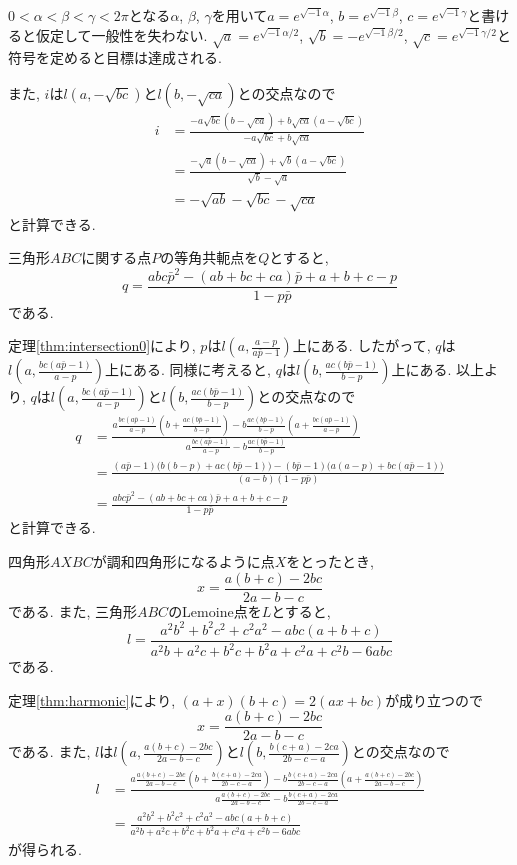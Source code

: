 \begin{prf*}
$0<\alpha<\beta<\gamma<2\pi$となる$\alpha$, $\beta$, $\gamma$を用いて$a=e^{\sqrt{-1}\alpha}$, $b=e^{\sqrt{-1}\beta}$, $c=e^{\sqrt{-1}\gamma}$と書けると仮定して一般性を失わない.
$\sqrt{a}=e^{\sqrt{-1}\alpha/2}$, $\sqrt{b}=-e^{\sqrt{-1}\beta/2}$, $\sqrt{c}=e^{\sqrt{-1}\gamma/2}$と符号を定めると目標は達成される.

また, $i$は$l(a,-\sqrt{bc})$と$l(b,-\sqrt{ca})$との交点なので
\begin{align*}
i
&=\frac{-a\sqrt{bc}(b-\sqrt{ca})+b\sqrt{ca}(a-\sqrt{bc})}{-a\sqrt{bc}+b\sqrt{ca}}\\
&=\frac{-\sqrt{a}(b-\sqrt{ca})+\sqrt{b}(a-\sqrt{bc})}{\sqrt{b}-\sqrt{a}}\\
&=-\sqrt{ab}-\sqrt{bc}-\sqrt{ca}
\end{align*}
と計算できる.
\end{prf*}
%
%
\begin{bthm}\label{thm:isogonal_conjugate}
三角形$ABC$に関する点$P$の等角共軛点を$Q$とすると,
\[q=\frac{abc\bar p^2-(ab+bc+ca)\bar p+a+b+c-p}{1-p\bar p}\]
である.
\end{bthm}
\begin{prf*}
定理\ref{thm:intersection0}により, $p$は$l(a,\frac{a-p}{a\bar p-1})$上にある.
したがって, $q$は$l(a,\frac{bc(a\bar p-1)}{a-p})$上にある.
同様に考えると, $q$は$l(b,\frac{ac(b\bar p-1)}{b-p})$上にある.
以上より, $q$は$l(a,\frac{bc(a\bar p-1)}{a-p})$と$l(b,\frac{ac(b\bar p-1)}{b-p})$との交点なので
\begin{align*}
q
&=\frac{a\frac{bc(a\bar p-1)}{a-p}(b+\frac{ac(b\bar p-1)}{b-p})-b\frac{ac(b\bar p-1)}{b-p}(a+\frac{bc(a\bar p-1)}{a-p})}{a\frac{bc(a\bar p-1)}{a-p}-b\frac{ac(b\bar p-1)}{b-p}}\\
&=\frac{(a\bar p-1)\bigl(b(b-p)+ac(b\bar p-1)\bigr)-(b\bar p-1)\bigl(a(a-p)+bc(a\bar p-1)\bigr)}{(a-b)(1-p\bar p)}\\
&=\frac{abc\bar p^2-(ab+bc+ca)\bar p+a+b+c-p}{1-p\bar p}
\end{align*}
と計算できる.
\end{prf*}
%
%
\begin{bthm}\label{thm:lemoine}
四角形$AXBC$が調和四角形になるように点$X$をとったとき,
\[x=\frac{a(b+c)-2bc}{2a-b-c}\]
である.
また, 三角形$ABC$のLemoine点を$L$とすると,
\[l=\frac{a^2b^2+b^2c^2+c^2a^2-abc(a+b+c)}{a^2b+a^2c+b^2c+b^2a+c^2a+c^2b-6abc}\]
である.
\end{bthm}
\begin{prf*}
定理\ref{thm:harmonic}により, $(a+x)(b+c)=2(ax+bc)$が成り立つので
\[x=\frac{a(b+c)-2bc}{2a-b-c}\]
である.
また, $l$は$l(a,\frac{a(b+c)-2bc}{2a-b-c})$と$l(b,\frac{b(c+a)-2ca}{2b-c-a})$との交点なので
\begin{align*}
l
&=\frac{a\frac{a(b+c)-2bc}{2a-b-c}(b+\frac{b(c+a)-2ca}{2b-c-a})-b\frac{b(c+a)-2ca}{2b-c-a}(a+\frac{a(b+c)-2bc}{2a-b-c})}{a\frac{a(b+c)-2bc}{2a-b-c}-b\frac{b(c+a)-2ca}{2b-c-a}}\\
&=\frac{a^2b^2+b^2c^2+c^2a^2-abc(a+b+c)}{a^2b+a^2c+b^2c+b^2a+c^2a+c^2b-6abc}
\end{align*}
が得られる.
\end{prf*}
